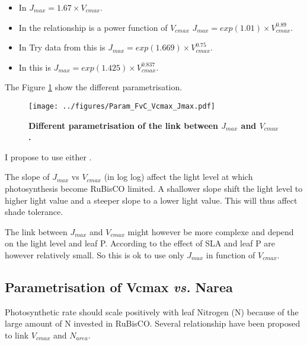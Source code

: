 \documentclass[a4paper,11pt]{article}
\begin{document}
\begin{itemize}

\item In \citet{Medlyn-2002} $J_{max} = 1.67 \times  V_{cmax}$.
  
\item In \citet{Walker-2014} the relationship is a power function of $V_{cmax}$ $J_{max} = exp(1.01) \times V_{cmax}^{0.89}$.

\item In Try data from \citet{Kattge-2011} this is $J_{max} = exp(1.669) \times V_{cmax}^{0.75}$.

\item In \citet{Wullschleger-1993} this is $J_{max} = exp(1.425) \times V_{cmax}^{0.837}$.

\end{itemize}

The Figure \ref{fig:Vcmax_Jmax} show the different parametrisation.

\begin{figure}[ht]
\centering
\texttt{[image: ../figures/Param\_FvC\_Vcmax\_Jmax.pdf]}
\caption{\textbf{Different parametrisation of the link between $J_{max}$ and $V_{cmax}$.}
\label{fig:Vcmax_Jmax}}
\end{figure}

I propose to use either \citet{Medlyn-2002}.

The slope of $J_{max}$ vs $V_{cmax}$ (in log log) affect the light level at which photosynthesis become RuBisCO limited. A shallower slope shift the light level to higher light value and a steeper slope to a lower light value. This will thus affect shade tolerance.

The link between $J_{max}$ and $V_{cmax}$ might however be more complexe and depend on the light level and leaf P. According to \citet{Walker-2014} the effect of SLA and leaf P are however relatively small. So this is ok to use only $J_{max}$ in function of $V_{cmax}$.

\subsection{Parametrisation of Vcmax \textit{vs.} Narea}

Photosynthetic rate should scale positively with leaf Nitrogen (N) because of the large amount of N invested in RuBisCO. Several relationship have been proposed to link $V_{cmax}$ and $N_{area}$.
\end{document}
